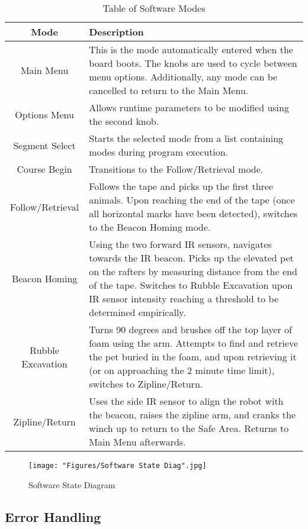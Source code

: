 \documentclass[11pt, oneside]{article} %
\begin{document}
\begin{table}
	\caption{Table of Software Modes}
	\centering
	\begin{tabular}{ | c | p{5in} | }
	\hline
	Mode & Description \\ \hline \hline
	Main Menu & This is the mode automatically entered when the board boots. The knobs are used to cycle between menu options. Additionally, any mode can be cancelled to return to the Main Menu. \\ \hline
	Options Menu & Allows runtime parameters to be modified using the second knob. \\ \hline
	Segment Select & Starts the selected mode from a list containing modes during program execution. \\ \hline
	Course Begin & Transitions to the Follow/Retrieval mode. \\ \hline
	Follow/Retrieval & Follows the tape and picks up the first three animals. Upon reaching the end of the tape (once all horizontal marks have been detected), switches to the Beacon Homing mode. \\ \hline
	Beacon Homing & Using the two forward IR sensors, navigates towards the IR beacon. Picks up the elevated pet on the rafters by measuring distance from the end of the tape. Switches to Rubble Excavation upon IR sensor intensity reaching a threshold to be determined empirically. \\ \hline
	Rubble Excavation & Turns 90 degrees and brushes off the top layer of foam using the arm. Attempts to find and retrieve the pet buried in the foam, and upon retrieving it (or on approaching the 2 minute time limit), switches to Zipline/Return. \\ \hline
	Zipline/Return &
	Uses the side IR sensor to align the robot with the beacon, raises the zipline arm, and cranks the winch up to return to the Safe Area. Returns to Main Menu afterwards.
	\\ \hline
	\end{tabular}
	\label{table:Software Modes}
\end{table}

\begin{figure}[h]
	\centering
	\texttt{[image: "Figures/Software State Diag".jpg]}
	\caption[Software State Diagram]{Software State Diagram}
	\label{fig:SoftStates}
\end{figure}

	\subsection{Error Handling}
\end{document}
